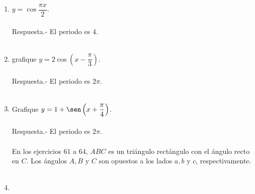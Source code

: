 \begin{enumerate}[\bfseries 1.]
\item $y = \cos \dfrac{\pi x}{2}$.\\\\
    Respuesta.-\; El periodo es $4$.\\\\ 

\item grafique $y = 2\cos\left(x - \dfrac{\pi}{3}\right)$.\\\\
    Respuesta.-\; El periodo es $2\pi$.\\\\ 

\item Grafique $y = 1 + \sen\left(x + \dfrac{\pi}{4}\right)$.\\\\
    Respuesta.-\; El periodo es $2\pi$.\\\\

En los ejercicios $61$ a $64$, $ABC$ es un triángulo rectángulo con el ángulo recto en $C$. Los ángulos $A, B$ y $C$ son opuestos a los lados $a, b$ y $c$, respectivamente.\\\\

\item 

\end{enumerate}

